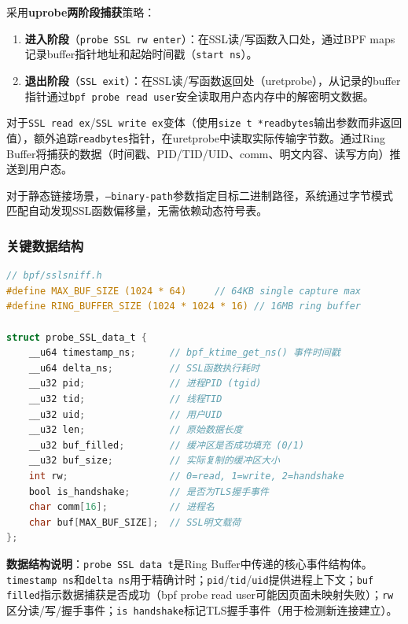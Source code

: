 \documentclass[a4paper]{ctexart}
\makeatletter
\renewcommand{\_}{%
  \ifmmode
    \nfss@text{\textunderscore}%
  \else
    \textunderscore\discretionary{}{}{}%
  \fi}
\makeatother
\begin{document}
采用\textbf{uprobe两阶段捕获}策略：

\begin{enumerate}
\item \textbf{进入阶段}（\texttt{probe\_SSL\_rw\_enter}）：在SSL读/写函数入口处，通过BPF maps记录buffer指针地址和起始时间戳（\texttt{start\_ns}）。
\item \textbf{退出阶段}（\texttt{SSL\_exit}）：在SSL读/写函数返回处（uretprobe），从记录的buffer指针通过\texttt{bpf\_probe\_read\_user}安全读取用户态内存中的解密明文数据。
\end{enumerate}

对于\texttt{SSL\_read\_ex}/\texttt{SSL\_write\_ex}变体（使用\texttt{size\_t *readbytes}输出参数而非返回值），额外追踪\texttt{readbytes}指针，在uretprobe中读取实际传输字节数。通过Ring Buffer将捕获的数据（时间戳、PID/TID/UID、comm、明文内容、读写方向）推送到用户态。


对于静态链接场景，\texttt{--binary-path}参数指定目标二进制路径，系统通过字节模式匹配自动发现SSL函数偏移量，无需依赖动态符号表。


\subsubsection{关键数据结构}



\begin{lstlisting}[language=C]
// bpf/sslsniff.h
#define MAX_BUF_SIZE (1024 * 64)     // 64KB single capture max
#define RING_BUFFER_SIZE (1024 * 1024 * 16) // 16MB ring buffer

struct probe_SSL_data_t {
    __u64 timestamp_ns;      // bpf_ktime_get_ns() 事件时间戳
    __u64 delta_ns;          // SSL函数执行耗时
    __u32 pid;               // 进程PID (tgid)
    __u32 tid;               // 线程TID
    __u32 uid;               // 用户UID
    __u32 len;               // 原始数据长度
    __u32 buf_filled;        // 缓冲区是否成功填充 (0/1)
    __u32 buf_size;          // 实际复制的缓冲区大小
    int rw;                  // 0=read, 1=write, 2=handshake
    bool is_handshake;       // 是否为TLS握手事件
    char comm[16];           // 进程名
    char buf[MAX_BUF_SIZE];  // SSL明文载荷
};
\end{lstlisting}


\textbf{数据结构说明}：\texttt{probe\_SSL\_data\_t}是Ring Buffer中传递的核心事件结构体。\texttt{timestamp\_ns}和\texttt{delta\_ns}用于精确计时；\texttt{pid}/\texttt{tid}/\texttt{uid}提供进程上下文；\texttt{buf\_filled}指示数据捕获是否成功（bpf\_probe\_read\_user可能因页面未映射失败）；\texttt{rw}区分读/写/握手事件；\texttt{is\_handshake}标记TLS握手事件（用于检测新连接建立）。
\end{document}
